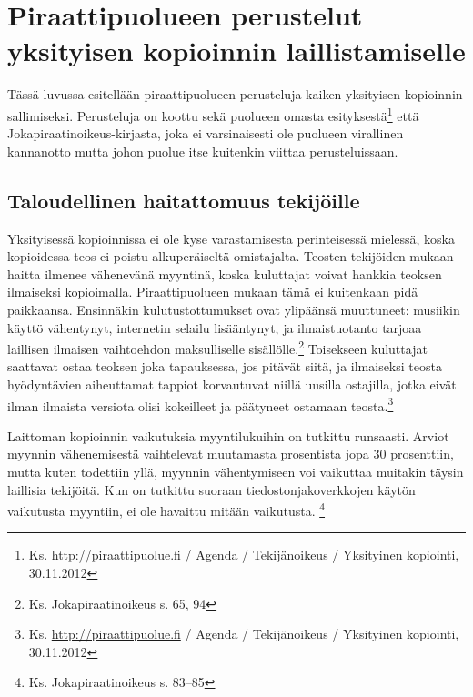 \documentclass[titlepage,12pt]{article}
\begin{document}




\section{Piraattipuolueen perustelut yksityisen kopioinnin
  laillistamiselle}

Tässä luvussa esitellään piraattipuolueen perusteluja kaiken
yksityisen kopioinnin sallimiseksi.  Perusteluja on koottu sekä
puolueen omasta
esityksestä\footnote{Ks. \url{http://piraattipuolue.fi} / Agenda /
  Tekijänoikeus / Yksityinen kopiointi, 30.11.2012} että
Jokapiraatin\-oikeus-kirjasta, joka ei varsinaisesti ole puolueen
virallinen kannanotto mutta johon puolue itse kuitenkin viittaa
perusteluissaan.

\subsection{Taloudellinen haitattomuus tekijöille}

Yksityisessä kopioinnissa ei ole kyse varastamisesta perinteisessä
mielessä, koska kopioidessa teos ei poistu alkuperäiseltä omistajalta.
Teosten tekijöiden mukaan haitta ilmenee vähenevänä myyntinä, koska
kuluttajat voivat hankkia teoksen ilmaiseksi kopioimalla.
Piraattipuolueen mukaan tämä ei kuitenkaan pidä paikkaansa.
Ensinnäkin kulutustottumukset ovat ylipäänsä muuttuneet: musiikin
käyttö vähentynyt, internetin selailu lisääntynyt, ja ilmaistuotanto
tarjoaa laillisen ilmaisen vaihtoehdon maksulliselle
sisällölle.\footnote{Ks. Jokapiraatinoikeus s. 65, 94} Toisekseen
kuluttajat saattavat ostaa teoksen joka tapauksessa, jos pitävät
siitä, ja ilmaiseksi teosta hyödyntävien aiheuttamat tappiot
korvautuvat niillä uusilla ostajilla, jotka eivät ilman ilmaista
versiota olisi kokeilleet ja päätyneet ostamaan
teosta.\footnote{Ks. \url{http://piraattipuolue.fi} / Agenda /
  Tekijänoikeus / Yksityinen kopiointi, 30.11.2012}

Laittoman kopioinnin vaikutuksia myyntilukuihin on tutkittu
runsaasti.
Arviot myynnin vähenemisestä vaihtelevat muutamasta prosentista jopa
30 prosenttiin, mutta kuten todettiin yllä, myynnin vähentymiseen voi
vaikuttaa muitakin täysin laillisia tekijöitä.  Kun on tutkittu
suoraan tiedostonjakoverkkojen käytön vaikutusta myyntiin, ei ole
havaittu mitään vaikutusta. \footnote{Ks. Jokapiraatinoikeus
  s. 83--85}
\end{document}
